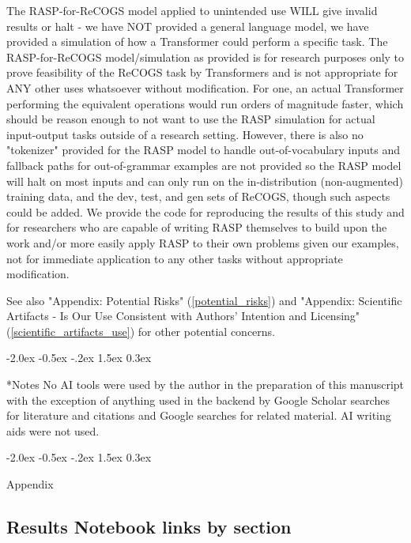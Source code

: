 \documentclass[11pt]{article}
\makeatletter
\renewcommand\section{\@startsection{section}{1}{\z@}%
                                  {-2.0ex \@plus -0.5ex \@minus -.2ex}%
                                  {1.5ex \@plus 0.3ex}%
                                  {\large\bfseries\raggedright}}
\makeatother
\begin{document}
The RASP-for-ReCOGS model applied to unintended use WILL give invalid results or halt - we have NOT provided a general language model, we have provided a simulation of how a Transformer could perform a specific task.
The RASP-for-ReCOGS model/simulation as provided is for research purposes only to prove feasibility of the ReCOGS task by Transformers and is not appropriate for ANY other uses whatsoever without modification. For one, an actual Transformer performing the equivalent operations would run orders of magnitude faster, which should be reason enough to not want to use the RASP simulation for actual input-output tasks outside of a research setting. However, there is also no "tokenizer" provided for the RASP model to handle out-of-vocabulary inputs and fallback paths for out-of-grammar examples are not provided so the RASP model will halt on most inputs and can only run on the in-distribution (non-augmented) training data, and the dev, test, and gen sets of ReCOGS, though such aspects could be added. We provide the code for reproducing the results of this study and for researchers who are capable of writing RASP themselves to build upon the work and/or more easily apply RASP to their own problems given our examples, not for immediate application to any other tasks without appropriate modification.

See also "Appendix: Potential Risks" (\ref{potential_risks}) and "Appendix: Scientific Artifacts - Is Our Use Consistent with Authors' Intention and Licensing" (\ref{scientific_artifacts_use}) for other potential concerns.




\section*{Notes}
No AI tools were used by the author in the preparation of this manuscript with the exception of anything used in the backend by Google Scholar searches for literature and citations and Google searches for related material. AI writing aids were not used.

\onecolumn
\section{Appendix}

\subsection{Results Notebook links by section}
\label{results_notebook_links_by_section}
\end{document}
